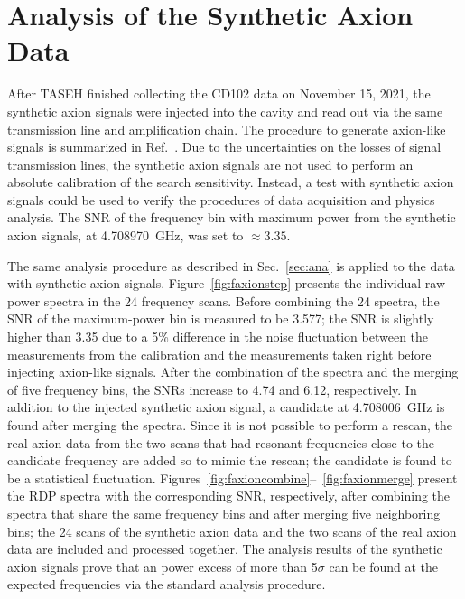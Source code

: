 \section{Analysis of the Synthetic Axion Data}\label{sec:faxion}
After TASEH finished collecting the CD102 data on November 15, 2021, 
the synthetic axion signals were injected into the cavity and read out via the 
same transmission line and amplification chain. The procedure 
to generate axion-like signals is summarized in 
Ref.~\cite{TASEHInstrumentation}. 
Due to the uncertainties on the losses of signal transmission
 lines, the synthetic axion signals are not used to perform an absolute 
calibration of the search sensitivity. Instead, 
a test with synthetic axion signals could be used to verify the procedures of 
data acquisition and physics analysis. The 
SNR of the frequency bin with maximum power from the 
synthetic axion signals, at 4.708970~GHz, was set to $\approx 3.35$.%

The same analysis procedure as described in Sec.~\ref{sec:ana} is applied 
to the data with synthetic axion signals. 
Figure~\ref{fig:faxionstep} presents the individual raw power spectra in 
the 24 frequency scans. Before combining 
the 24 spectra, the SNR of the maximum-power bin is measured to be 
3.577; the SNR is slightly higher than 3.35 due to a 
5\% difference in the noise fluctuation between the measurements from 
the calibration and the measurements taken 
right before injecting axion-like signals. After the combination 
of the spectra and the merging of five frequency 
bins, the SNRs increase to 4.74 and 6.12, respectively. In addition to the 
injected synthetic axion signal, a candidate at 4.708006~GHz is found after 
merging the spectra. Since it is not possible to perform a rescan, 
the real axion data from the two scans that had resonant frequencies close to 
the candidate frequency are added so to mimic the rescan; the candidate is 
found to be a statistical fluctuation.  
Figures~\ref{fig:faxioncombine}--~\ref{fig:faxionmerge} present 
the RDP spectra with the corresponding SNR, respectively, after combining 
the spectra that share the same frequency bins and after merging five 
neighboring bins; the 24 scans of the synthetic axion data and the two 
scans of the real axion data are included and processed together. 
The analysis results of the synthetic axion signals prove that an power 
excess of more than 5$\sigma$ can be found at the expected frequencies via 
the standard analysis procedure.  

